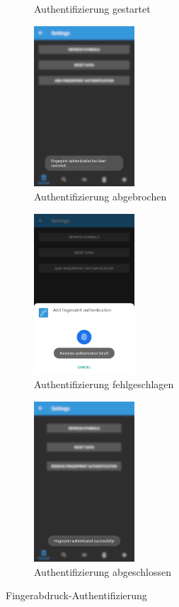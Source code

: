 \documentclass[a4paper]{article}
\begin{document}
\begin{figure}[H]
\begin{subfigure}{.329\textwidth}
        \caption{Authentifizierung gestartet}
        \label{fig:functionality:settings:fingerprint:requested}
    \end{subfigure}
    \begin{subfigure}{.329\textwidth}
        \centering
        \includegraphics[height=6cm,keepaspectratio]{./images/settings/fingerprint_add_canceled.png}
        \caption{Authentifizierung abgebrochen}
        \label{fig:functionality:settings:fingerprint:canceled}
    \end{subfigure}
    \begin{subfigure}{.329\textwidth}
        \centering
        \includegraphics[height=6cm,keepaspectratio]{./images/settings/fingerprint_add_failed.png}
        \caption{Authentifizierung fehlgeschlagen}
        \label{fig:functionality:settings:fingerprint:failed}
    \end{subfigure}
    \begin{subfigure}{.329\textwidth}
        \centering
        \includegraphics[height=6cm,keepaspectratio]{./images/settings/fingerprint_add_done.png}
        \caption{Authentifizierung abgeschlossen}
        \label{fig:functionality:settings:fingerprint:done}
    \end{subfigure}
    \caption{Fingerabdruck-Authentifizierung}
    \label{fig:functionality:settings:fingerprint}
\end{figure}
\end{document}

